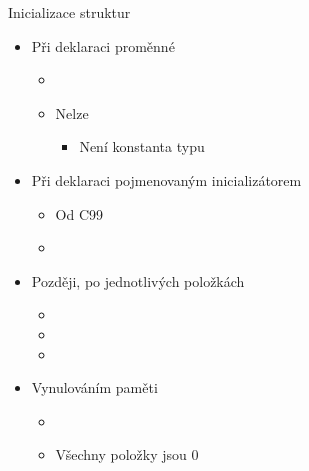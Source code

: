 \begin{frame}{Inicializace struktur}

  \begin{itemize}
    \item Při deklaraci proměnné
    \begin{itemize}
      \item {}
      \item Nelze 
      \begin{itemize}
	\item Není konstanta typu 
      \end{itemize}
    \end{itemize}

    \pause

    \item Při deklaraci pojmenovaným inicializátorem
    \begin{itemize}
      \item Od C99
      \item {}
    \end{itemize}

    \pause

    \item Později, po jednotlivých položkách
    \begin{itemize}
      \item {}
      \item {}
      \item {}
    \end{itemize}

    \pause

    \item Vynulováním paměti
    \begin{itemize}
      \item {}
      \item Všechny položky jsou 0
    \end{itemize}

  \end{itemize}

\end{frame}


